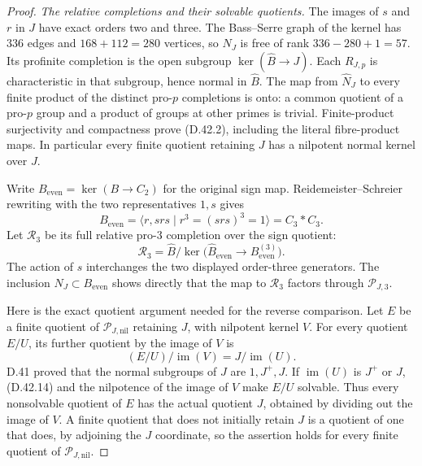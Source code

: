 \begin{proof}
\emph{The relative completions and their solvable quotients.}
The images of $s$ and $r$ in $J$ have exact orders
two and three. The Bass--Serre graph of the kernel
has $336$ edges and $168+112=280$ vertices, so
$N_J$ is free of rank $336-280+1=57$.
Its profinite completion is the open subgroup
$\ker(\widehat B\to J)$. Each $R_{J,p}$ is
characteristic in that subgroup, hence normal in
$\widehat B$. The map from $\widehat N_J$ to every
finite product of the distinct pro-$p$ completions
is onto: a common quotient of a pro-$p$ group and
a product of groups at other primes is trivial.
Finite-product surjectivity and compactness prove
(D.42.2), including the literal fibre-product maps.
In particular every finite quotient retaining
$J$ has a nilpotent normal kernel over $J$.

Write $B_{\mathrm{even}}=\ker(B\to C_2)$ for the
original sign map. Reidemeister--Schreier rewriting
with the two representatives $1,s$ gives
\[
 B_{\mathrm{even}}
   =\langle r,srs\mid r^3=(srs)^3=1\rangle
   =C_3*C_3.                                         \tag{D.42.12}
\]
Let $\mathcal R_3$ be its full relative pro-$3$
completion over the sign quotient:
\[
 \mathcal R_3
  =\widehat B/
      \ker\bigl(\widehat B_{\mathrm{even}}
                   \to B_{\mathrm{even}}^{(3)}\bigr).
                                                               \tag{D.42.13}
\]
The action of $s$ interchanges the two displayed
order-three generators. The inclusion
$N_J\subset B_{\mathrm{even}}$ shows directly
that the map to $\mathcal R_3$ factors through
$\mathcal P_{J,3}$.

Here is the exact quotient argument needed for
the reverse comparison. Let $E$ be a finite
quotient of $\mathcal P_{J,\mathrm{nil}}$
retaining $J$, with nilpotent kernel $V$.
For every quotient $E/U$, its further quotient
by the image of $V$ is
\[
 (E/U)/\operatorname{im}(V)
       =J/\operatorname{im}(U).                       \tag{D.42.14}
\]
D.41 proved that the normal subgroups of $J$
are $1,J^+,J$. If $\operatorname{im}(U)$ is
$J^+$ or $J$, (D.42.14) and the nilpotence of
the image of $V$ make $E/U$ solvable.
Thus every nonsolvable quotient of $E$ has
the actual quotient $J$, obtained by dividing
out the image of $V$. A finite quotient that
does not initially retain $J$ is a quotient
of one that does, by adjoining the $J$
coordinate, so the assertion holds for every
finite quotient of $\mathcal P_{J,\mathrm{nil}}$.


\end{proof}
